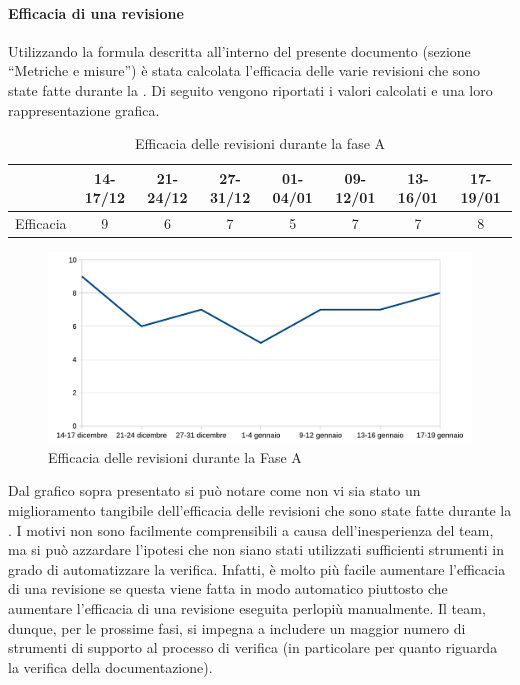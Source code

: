			\paragraph{Efficacia di una revisione}
				Utilizzando la formula descritta all'interno del presente documento (sezione “Metriche e misure”) è stata calcolata l'efficacia delle 
				varie revisioni che sono state fatte durante la . Di seguito vengono riportati i valori calcolati e una loro rappresentazione grafica.
				\begin{table}[H]
					\centering
					\begin{tabu}{| l | c | c | c | c | c | c | c |}
						\hline
							&14-17/12	&21-24/12	&27-31/12 	&01-04/01	&09-12/01	&13-16/01	&17-19/01	\\ \hline
						Efficacia	&9	&6	&7	&5	&7	&7	&8 \\ \hline
					\end{tabu}
					\caption{Efficacia delle revisioni durante la fase A}
				\end{table}
				\begin{figure}[H]
					\centering
					\includegraphics[width=12cm]{PianoDiQualifica/Pics/EfficaciaRevisioniFaseA.pdf}
					\caption{Efficacia delle revisioni durante la Fase A}
				\end{figure}
				Dal grafico sopra presentato si può notare come non vi sia stato un miglioramento tangibile dell'efficacia delle revisioni che sono 
				state fatte durante la . I motivi non sono facilmente comprensibili a causa dell'inesperienza del team, ma si può azzardare 
				l'ipotesi che non siano stati utilizzati sufficienti strumenti in grado di automatizzare la verifica. Infatti, è molto più facile 
				aumentare l'efficacia di una revisione se questa viene fatta in modo automatico piuttosto che aumentare l'efficacia di una revisione 
				eseguita perlopiù manualmente. Il team, dunque, per le prossime fasi, si impegna a includere un maggior numero di strumenti di supporto 
				al processo di verifica (in particolare per quanto riguarda la verifica della documentazione).
